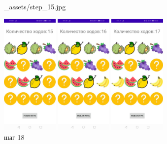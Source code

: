\documentclass[12pt, a4paper, simple]{eskdtext}
\begin{document}
\begin{figure}[!h]
\begin{minipage}{0.15\textwidth}
                {_assets/step_15.jpg}
            \caption{шаг 15}
            \label{fig:step_15}
        \end{minipage}
        \begin{minipage}{0.15\textwidth}
            \centering
            \includegraphics[height=6cm]
                {_assets/step_16.jpg}
            \caption{шаг 16}
            \label{fig:step_16}
        \end{minipage}
        \begin{minipage}{0.15\textwidth}
            \centering
            \includegraphics[height=6cm]
                {_assets/step_17.jpg}
            \caption{шаг 17}
            \label{fig:step_17}
        \end{minipage}
        \begin{minipage}{0.15\textwidth}
            \centering
            \includegraphics[height=6cm]
                {_assets/step_18.jpg}
            \caption{шаг 18}
            \label{fig:step_18}
        \end{minipage}
    \end{figure}
    
\end{document}
